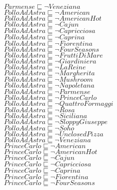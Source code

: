 \documentclass[a4paper,10pt]{article}
\begin{document}
 $Parmense \sqsubseteq  \lnot Veneziana$\\ 
 $PolloAdAstra \sqsubseteq  \lnot American$\\ 
 $PolloAdAstra \sqsubseteq  \lnot AmericanHot$\\ 
 $PolloAdAstra \sqsubseteq  \lnot Cajun$\\ 
 $PolloAdAstra \sqsubseteq  \lnot Capricciosa$\\ 
 $PolloAdAstra \sqsubseteq  \lnot Caprina$\\ 
 $PolloAdAstra \sqsubseteq  \lnot Fiorentina$\\ 
 $PolloAdAstra \sqsubseteq  \lnot FourSeasons$\\ 
 $PolloAdAstra \sqsubseteq  \lnot FruttiDiMare$\\ 
 $PolloAdAstra \sqsubseteq  \lnot Giardiniera$\\ 
 $PolloAdAstra \sqsubseteq  \lnot LaReine$\\ 
 $PolloAdAstra \sqsubseteq  \lnot Margherita$\\ 
 $PolloAdAstra \sqsubseteq  \lnot Mushroom$\\ 
 $PolloAdAstra \sqsubseteq  \lnot Napoletana$\\ 
 $PolloAdAstra \sqsubseteq  \lnot Parmense$\\ 
 $PolloAdAstra \sqsubseteq  \lnot PrinceCarlo$\\ 
 $PolloAdAstra \sqsubseteq  \lnot QuattroFormaggi$\\ 
 $PolloAdAstra \sqsubseteq  \lnot Rosa$\\ 
 $PolloAdAstra \sqsubseteq  \lnot Siciliana$\\ 
 $PolloAdAstra \sqsubseteq  \lnot SloppyGiuseppe$\\ 
 $PolloAdAstra \sqsubseteq  \lnot Soho$\\ 
 $PolloAdAstra \sqsubseteq  \lnot UnclosedPizza$\\ 
 $PolloAdAstra \sqsubseteq  \lnot Veneziana$\\ 
 $PrinceCarlo \sqsubseteq  \lnot American$\\ 
 $PrinceCarlo \sqsubseteq  \lnot AmericanHot$\\ 
 $PrinceCarlo \sqsubseteq  \lnot Cajun$\\ 
 $PrinceCarlo \sqsubseteq  \lnot Capricciosa$\\ 
 $PrinceCarlo \sqsubseteq  \lnot Caprina$\\ 
 $PrinceCarlo \sqsubseteq  \lnot Fiorentina$\\ 
 $PrinceCarlo \sqsubseteq  \lnot FourSeasons$\\ 
\end{document}
